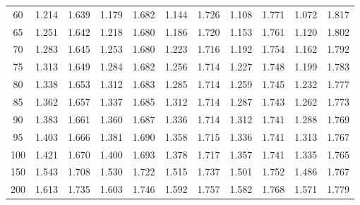 \documentclass[12pt]{article}
\begin{document}
\begin{table}
\begin{center}
{\begin{tabular}{|c|c|c|c|c|c|c|c|c|c|c|}
	60&1.214&1.639&1.179&1.682&1.144&1.726&1.108&1.771&1.072&1.817\\
	65&1.251&1.642&1.218&1.680&1.186&1.720&1.153&1.761&1.120&1.802\\
	70&1.283&1.645&1.253&1.680&1.223&1.716&1.192&1.754&1.162&1.792\\
	75&1.313&1.649&1.284&1.682&1.256&1.714&1.227&1.748&1.199&1.783\\
	80&1.338&1.653&1.312&1.683&1.285&1.714&1.259&1.745&1.232&1.777\\
	85&1.362&1.657&1.337&1.685&1.312&1.714&1.287&1.743&1.262&1.773\\
	90&1.383&1.661&1.360&1.687&1.336&1.714&1.312&1.741&1.288&1.769\\
	95&1.403&1.666&1.381&1.690&1.358&1.715&1.336&1.741&1.313&1.767\\
	100&1.421&1.670&1.400&1.693&1.378&1.717&1.357&1.741&1.335&1.765\\
	150&1.543&1.708&1.530&1.722&1.515&1.737&1.501&1.752&1.486&1.767\\
	200&1.613&1.735 &1.603&1.746&1.592&1.757 &1.582& 1.768&1.571&1.779\\
	\hline
\end{tabular}
}
\end{center}
\end{table}
\end{document}
